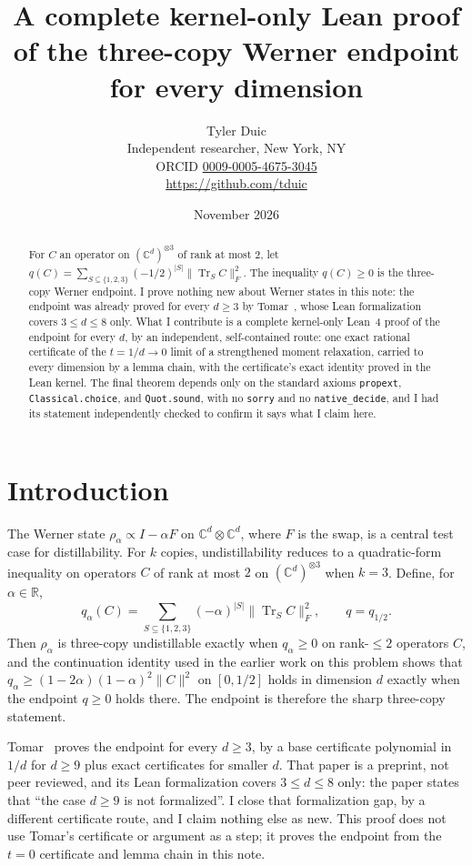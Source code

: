 \documentclass[11pt]{article}
\title{A complete kernel-only Lean proof\\ of the three-copy Werner endpoint\\ for every dimension}
\author{Tyler Duic\\[2pt]\small Independent researcher, New York, NY\\\small ORCID \href{https://orcid.org/0009-0005-4675-3045}{0009-0005-4675-3045}\\\small\url{https://github.com/tduic}}
\date{November 2026}
\theoremstyle{remark}
\newcommand{\C}{\mathbb{C}}
\newcommand{\Tr}{\operatorname{Tr}}
\begin{document}
\maketitle

\begin{abstract}
For $C$ an operator on $(\C^d)^{\otimes 3}$ of rank at most $2$, let
$q(C) = \sum_{S \subseteq \{1,2,3\}} (-1/2)^{|S|} \lVert \Tr_S C \rVert_F^2$.
The inequality $q(C) \ge 0$ is the three-copy Werner endpoint.
I prove nothing new about Werner states in this note: the endpoint was
already proved for every $d \ge 3$ by Tomar~\cite{tomar2026}, whose Lean
formalization covers $3 \le d \le 8$ only.
What I contribute is a complete kernel-only Lean~4 proof of the endpoint
for every $d$, by an independent, self-contained route: one exact rational certificate of
the $t = 1/d \to 0$ limit of a strengthened moment relaxation, carried to
every dimension by a lemma chain, with the certificate's exact identity
proved in the Lean kernel.
The final theorem depends only on the standard axioms
\texttt{propext}, \texttt{Classical.choice}, and \texttt{Quot.sound},
with no \texttt{sorry} and no \texttt{native\_decide}, and I had its
statement independently checked to confirm it says what I claim here.
\end{abstract}

\section{Introduction}

The Werner state $\rho_\alpha \propto I - \alpha F$ on $\C^d \otimes \C^d$,
where $F$ is the swap, is a central test case for distillability.
For $k$ copies, undistillability reduces to a quadratic-form inequality on
operators $C$ of rank at most $2$ on $(\C^d)^{\otimes 3}$ when $k = 3$.
Define, for $\alpha \in \mathbb{R}$,
\begin{equation}
q_\alpha(C) = \sum_{S \subseteq \{1,2,3\}} (-\alpha)^{|S|} \lVert \Tr_S C \rVert_F^2,
\qquad q = q_{1/2}.
\end{equation}
Then $\rho_\alpha$ is three-copy undistillable exactly when $q_\alpha \ge 0$
on rank-$\le 2$ operators $C$, and the continuation identity used in the
earlier work on this problem shows that
$q_\alpha \ge (1-2\alpha)(1-\alpha)^2 \lVert C \rVert^2$ on $[0, 1/2]$
holds in dimension $d$ exactly when the endpoint $q \ge 0$ holds there.
The endpoint is therefore the sharp three-copy statement.

Tomar~\cite{tomar2026} proves the endpoint for every $d \ge 3$,
by a base certificate polynomial in $1/d$ for $d \ge 9$ plus exact
certificates for smaller $d$.
That paper is a preprint, not peer reviewed, and its Lean formalization
covers $3 \le d \le 8$ only: the paper states that
``the case $d \ge 9$ is not formalized''.
I close that formalization gap, by a different certificate route, and I
claim nothing else as new. This proof does not use Tomar's certificate
or argument as a step; it proves the endpoint from the $t = 0$ certificate
and lemma chain in this note.
\end{document}
